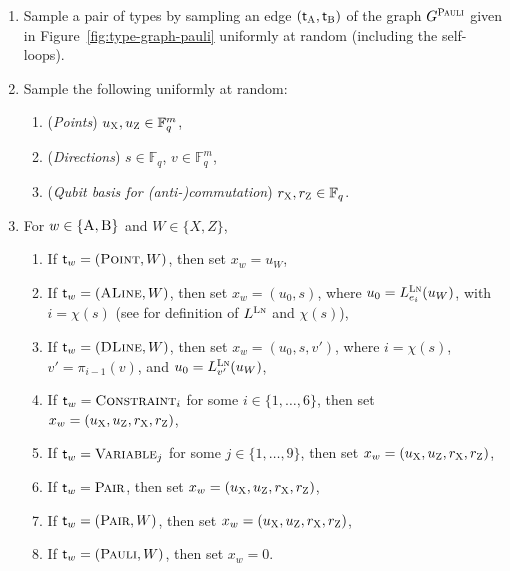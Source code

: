 \documentclass[11pt]{article}
\theoremstyle{definition}
\newcommand{\F}{\ensuremath{\mathbb{F}}}
\newcommand{\gamestyle}[1]{\ensuremath{\textsc{#1}}\xspace}
\newcommand{\pauli}{\gamestyle{Pauli}}
\newcommand{\labelstyle}[1]{\ensuremath{\textsc{#1}}\xspace}
\newcommand{\xpt}{\labelstyle{X}}
\newcommand{\zpt}{\labelstyle{Z}}
\newcommand{\lnf}{\labelstyle{Ln}}
\newcommand{\tvarstyle}[1]{\mathsf{#1}}
\newcommand{\tvar}{\ensuremath{\tvarstyle{t}}}
\newcommand{\alice}{\labelstyle{A}}
\newcommand{\bob}{\labelstyle{B}}
\newcommand{\typestyle}[1]{\ensuremath{\textsc{#1}}\xspace}
\newcommand{\Point}{\typestyle{Point}}
\newcommand{\ALine}{\typestyle{ALine}}
\newcommand{\DLine}{\typestyle{DLine}}
\newcommand{\Pair}{\typestyle{Pair}}
\newcommand{\Constraint}{\typestyle{Constraint}}
\newcommand{\Variable}{\typestyle{Variable}}
\newcommand{\Pauli}{\typestyle{Pauli}}
\newcommand{\AB}{\{\alice, \bob\}}
\begin{document}
\begin{enumerate}
\item Sample a pair of types by sampling an edge $(\tvar_\alice, \tvar_\bob)$ of
  the graph $G^\pauli$ given in Figure~\ref{fig:type-graph-pauli} uniformly at
  random (including the self-loops).
\item Sample the following uniformly at random:
	\begin{enumerate}
	\item (\emph{Points}) $u_\xpt,u_\zpt \in \F_q^m$,
	\item (\emph{Directions}) $s \in \F_q$, $v \in \F_q^m$,
  \item (\emph{Qubit basis for (anti-)commutation}) $r_\xpt,r_\zpt \in \F_q$.
	\end{enumerate}
\item For $w \in \AB$ and $W\in\{X,Z\}$,
	\begin{enumerate}
  \item If $\tvar_w = (\Point, W)$, then set $x_w = u_W$,
  \item If $\tvar_w = (\ALine, W)$, then set $x_w = (u_0,s)$, where $u_0 =
    L^\lnf_{e_i}(u_W)$, with $i = \chi(s)$ (see  for
    definition of $L^\lnf$ and $\chi(s)$),
  \item If $\tvar_w = (\DLine,W)$, then set $x_w = (u_0,s,v')$, where $i =
    \chi(s)$, $v' = \pi_{i-1}(v)$, and $u_0 = L^\lnf_{v'}(u_W)$,
  \item If $\tvar_w = \Constraint_i$ for some $i\in\{1,\ldots,6\}$, then set
    $x_w = (u_\xpt, u_\zpt, r_\xpt, r_\zpt)$,
  \item If $\tvar_w = \Variable_j$ for some $j\in\{1,\ldots,9\}$, then set $x_w
    = (u_\xpt, u_\zpt, r_\xpt, r_\zpt)$,
  \item If $\tvar_w = \Pair$, then set $x_w = (u_\xpt, u_\zpt, r_\xpt, r_\zpt)$,
  \item If $\tvar_w = (\Pair, W)$, then set $x_w = (u_\xpt, u_\zpt, r_\xpt, r_\zpt)$,
  \item If $\tvar_w = (\Pauli, W)$, then set $x_w = 0$.
	\end{enumerate}
\end{enumerate}
\end{document}
